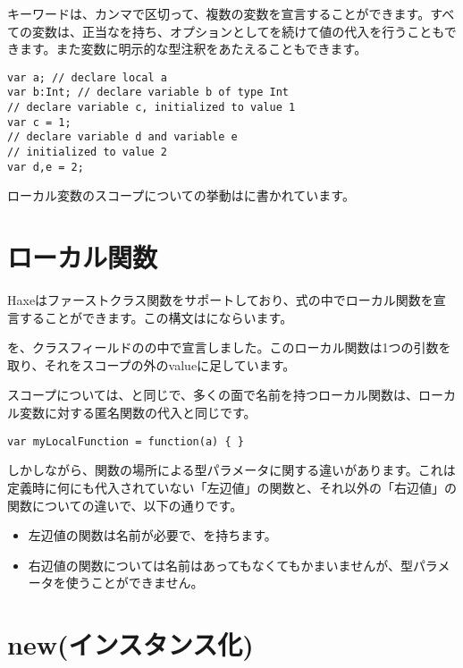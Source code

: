 キーワードは、カンマ\expr{,}で区切って、複数の変数を宣言することができます。すべての変数は、正当なを持ち、オプションとして\expr{=}を続けて値の代入を行うこともできます。また変数に明示的な型注釈をあたえることもできます。

\begin{lstlisting}
var a; // declare local a
var b:Int; // declare variable b of type Int
// declare variable c, initialized to value 1
var c = 1;
// declare variable d and variable e
// initialized to value 2
var d,e = 2;
\end{lstlisting}

ローカル変数のスコープについての挙動はに書かれています。

\section{ローカル関数}
\label{expression-function}

Haxeはファーストクラス関数をサポートしており、式の中でローカル関数を宣言することができます。この構文はにならいます。


を、クラスフィールドのの中で宣言しました。このローカル関数は1つの引数を取り、それをスコープの外のvalueに足しています。

スコープについては、と同じで、多くの面で名前を持つローカル関数は、ローカル変数に対する匿名関数の代入と同じです。

\begin{lstlisting}
var myLocalFunction = function(a) { }
\end{lstlisting}

しかしながら、関数の場所による型パラメータに関する違いがあります。これは定義時に何にも代入されていない「左辺値」の関数と、それ以外の「右辺値」の関数についての違いで、以下の通りです。

\begin{itemize}
	\item 左辺値の関数は名前が必要で、を持ちます。
	\item 右辺値の関数については名前はあってもなくてもかまいませんが、型パラメータを使うことができません。
\end{itemize}

\section{new(インスタンス化)}
\label{expression-new}

